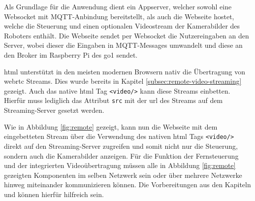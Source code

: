 \noindent Als Grundlage für die Anwendung dient ein Appserver, welcher sowohl eine Websocket mit MQTT-Anbindung bereitstellt,
als auch die Webseite hostet, welche die Steuerung und einen optionalen Videostream der Kamerabilder des Roboters enthält.
Die Webseite sendet per Websocket die Nutzereingaben an den Server, wobei dieser die Eingaben in MQTT-Messages umwandelt
und diese an den Broker im Raspberry Pi des \gls{go1} sendet.


\gls{html} unterstützt in den meisten modernen Browsern nativ die Übertragung von \gls{webrtc} Streams.
Dies wurde bereits in Kapitel \ref{subsec:remote-video-streaming} gezeigt.
Auch das native \gls{html} Tag \texttt{<video/>} kann diese Streams einbetten.
Hierfür muss lediglich das Attribut \texttt{src} mit der \gls{url} des Streams auf dem Streaming-Server gesetzt werden.

Wie in Abbildung \ref{fig:remote} gezeigt, kann nun die Webseite mit dem eingebetteten Stream über die Verwendung des
nativen \gls{html} Tags \texttt{<video/>} direkt auf den Streaming-Server zugreifen und somit nicht nur die Steuerung,
sondern auch die Kamerabilder anzeigen.
Für die Funktion der Fernsteuerung und der integrierten Videoübertragung müssen alle in Abbildung \ref{fig:remote} gezeigten
Komponenten im selben Netzwerk sein oder über mehrere Netzwerke hinweg miteinander kommunizieren können.
Die Vorbereitungen aus den Kapiteln  und  können hierfür hilfreich sein.